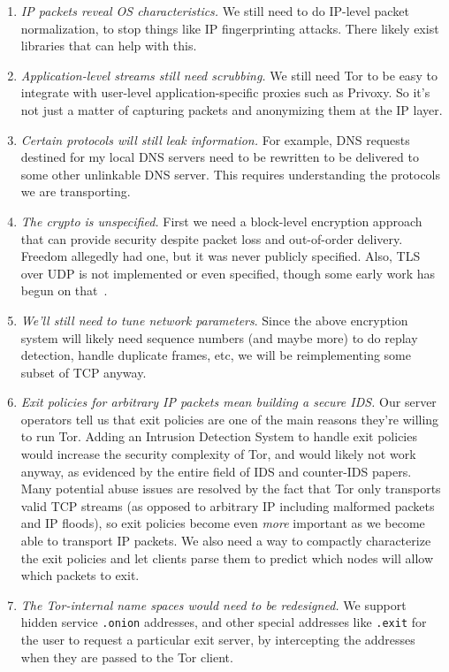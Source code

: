 \documentclass{llncs}
\begin{document}
\begin{enumerate}
\setlength{\itemsep}{0mm}
\setlength{\parsep}{0mm}
\item \emph{IP packets reveal OS characteristics.} We still need to do
IP-level packet normalization, to stop things like IP fingerprinting
attacks. There likely exist libraries that can help with this.
\item \emph{Application-level streams still need scrubbing.} We still need
Tor to be easy to integrate with user-level application-specific proxies
such as Privoxy. So it's not just a matter of capturing packets and
anonymizing them at the IP layer.
\item \emph{Certain protocols will still leak information.} For example,
DNS requests destined for my local DNS servers need to be rewritten
to be delivered to some other unlinkable DNS server. This requires
understanding the protocols we are transporting.
\item \emph{The crypto is unspecified.} First we need a block-level encryption
approach that can provide security despite
packet loss and out-of-order delivery. Freedom allegedly had one, but it was
never publicly specified. %
Also, TLS over UDP is not implemented or even
specified, though some early work has begun on that~\cite{dtls}.
\item \emph{We'll still need to tune network parameters}. Since the above
encryption system will likely need sequence numbers (and maybe more) to do
replay detection, handle duplicate frames, etc, we will be reimplementing
some subset of TCP anyway.
\item \emph{Exit policies for arbitrary IP packets mean building a secure
IDS.}  Our server operators tell us that exit policies are one of
the main reasons they're willing to run Tor.
Adding an Intrusion Detection System to handle exit policies would
increase the security complexity of Tor, and would likely not work anyway,
as evidenced by the entire field of IDS and counter-IDS papers. Many
potential abuse issues are resolved by the fact that Tor only transports
valid TCP streams (as opposed to arbitrary IP including malformed packets
and IP floods), so exit policies become even \emph{more} important as
we become able to transport IP packets. We also need a way to compactly
characterize the exit policies and let clients parse them to predict
which nodes will allow which packets to exit.
\item \emph{The Tor-internal name spaces would need to be redesigned.} We
support hidden service {\tt{.onion}} addresses, and other special addresses
like {\tt{.exit}} for the user to request a particular exit server,
by intercepting the addresses when they are passed to the Tor client.
\end{enumerate}
\end{document}
